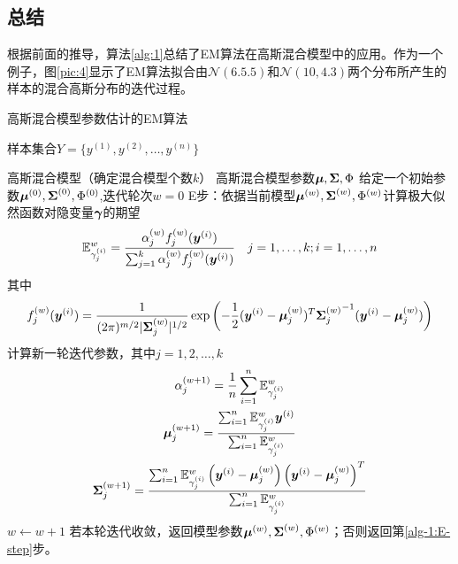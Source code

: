 \documentclass[a4paper,UTF8]{article}
\begin{document}
\subsection{总结}
根据前面的推导，算法\ref{alg:1}总结了EM算法在高斯混合模型中的应用。作为一个例子，图\ref{pic:4}显示了EM算法拟合由\(\mathcal{N}(6.5.5)\)和\(\mathcal{N}(10,4.3)\)两个分布所产生的样本的混合高斯分布的迭代过程。
\begin{algorithm}
    \caption{高斯混合模型参数估计的EM算法}\label{alg:1}
    \begin{algorithmic}[1] %
        \Require
            样本集合\(Y=\{y^{(1)},y^{(2)},\dotsc,y^{(n)}\}\)

            高斯混合模型（确定混合模型个数$k$）
        \Ensure
            高斯混合模型参数$\myvec{\mu},\myvec{\Sigma},\Phi$
        \State 给定一个初始参数$\myvec{\mu}^{(0)},\myvec{\Sigma}^{(0)},\Phi^{(0)}$,迭代轮次\(w=0\)
        \State E步：依据当前模型$\myvec{\mu}^{(w)},\myvec{\Sigma}^{(w)},\Phi^{(w)}$计算极大似然函数对隐变量\(\myvec{\gamma}\)的期望\[
            \expectation_{\gamma_j^{(i)}}^w=\frac{
                \alpha^{(w)}_jf^{(w)}_j(\myvec{y}^{(i)})
            }{
                \sum_{j=1}^k\alpha^{(w)}_jf^{(w)}_j(\myvec{y}^{(i)})
            }\quad j=1,\dotsc,k; i=1,\dotsc,n
        \]其中\[
            f_j^{(w)}(\myvec{y}^{(i)})=\ngaussiandistvar[m]{\myvec{y}^{(i)}}{\myvec{\mu}^{(w)}_j}{\myvec{\Sigma}^{(w)}_j}
        \]
        \label{alg-1:E-step}
        \State 计算新一轮迭代参数，其中\(j=1,2,\dotsc,k\)\begin{gather}
            \alpha^{(w+1)}_j=\frac{1}{n}\sum_{i=1}^n\expectation_{\gamma^{(i)}_j}^w\\
            \myvec{\mu}^{(w+1)}_j=\frac{
                \sum_{i=1}^n \expectation_{\gamma_j^{(i)}}^w \myvec{y}^{(i)}    
            }{
                \sum_{i=1}^n\expectation_{\gamma_j^{(i)}}^w
            }\\
            \myvec{\Sigma}^{(w+1)}_j=\frac{
                \sum_{i=1}^n\expectation_{\gamma_j^{(i)}}^w
                    \left(
                        \myvec{y}^{(i)}-\myvec{\mu}^{(w)}_j
                    \right)\left(
                        \myvec{y}^{(i)}-\myvec{\mu}^{(w)}_j
                    \right)^T
            }{
                \sum_{i=1}^n\expectation_{\gamma_j^{(i)}}^w
            }
        \end{gather}
        \State \( w \gets w+1\)
        \State 若本轮迭代收敛，返回模型参数$\myvec{\mu}^{(w)},\myvec{\Sigma}^{(w)},\Phi^{(w)}$；否则返回第\ref{alg-1:E-step}步。
    \end{algorithmic}
\end{algorithm}
\end{document}
